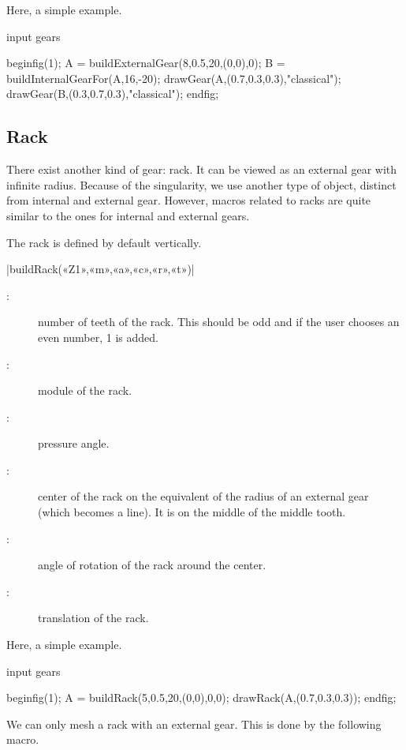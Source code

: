 \documentclass[english]{ltxdoc}
\begin{document}
Here, a simple example.
\begin{ExempleMP}
input gears

beginfig(1);
A = buildExternalGear(8,0.5,20,(0,0),0);
B = buildInternalGearFor(A,16,-20);
drawGear(A,(0.7,0.3,0.3),"classical");
drawGear(B,(0.3,0.7,0.3),"classical");
endfig;
\end{ExempleMP}

\subsection{Rack}\label{sec:rack}

There exist another kind of gear: rack. It can be viewed as an external gear
with infinite radius. Because of the singularity, we use another type of object,
distinct from internal and external gear. However, macros related to racks are
quite similar to the ones for internal and external gears. 

The rack is defined by default vertically. 

\begin{colourband}
\commande|buildRack(«Z1»,«m»,«a»,«c»,«r»,«t»)|\smallskip{}
\begin{description}
  \item[:]  number of teeth of the rack. This should be
  odd and if the user chooses an even number, 1 is added. 
  \item[:]  module of the rack.
  \item[:]  pressure angle.
  \item[:]  center of the rack on the equivalent of the
  radius of an external gear (which becomes a line). It is on the middle of the
  middle tooth. 
  \item[:]  angle of rotation of the rack around the center.
  \item[:]  translation of the rack. 
\end{description}
\end{colourband}

Here, a simple example.
\begin{ExempleMP}
input gears

beginfig(1);
A = buildRack(5,0.5,20,(0,0),0,0);
drawRack(A,(0.7,0.3,0.3));
endfig;
\end{ExempleMP}

We can only mesh a rack with an external gear. This is done by the following
macro. 
\end{document}
